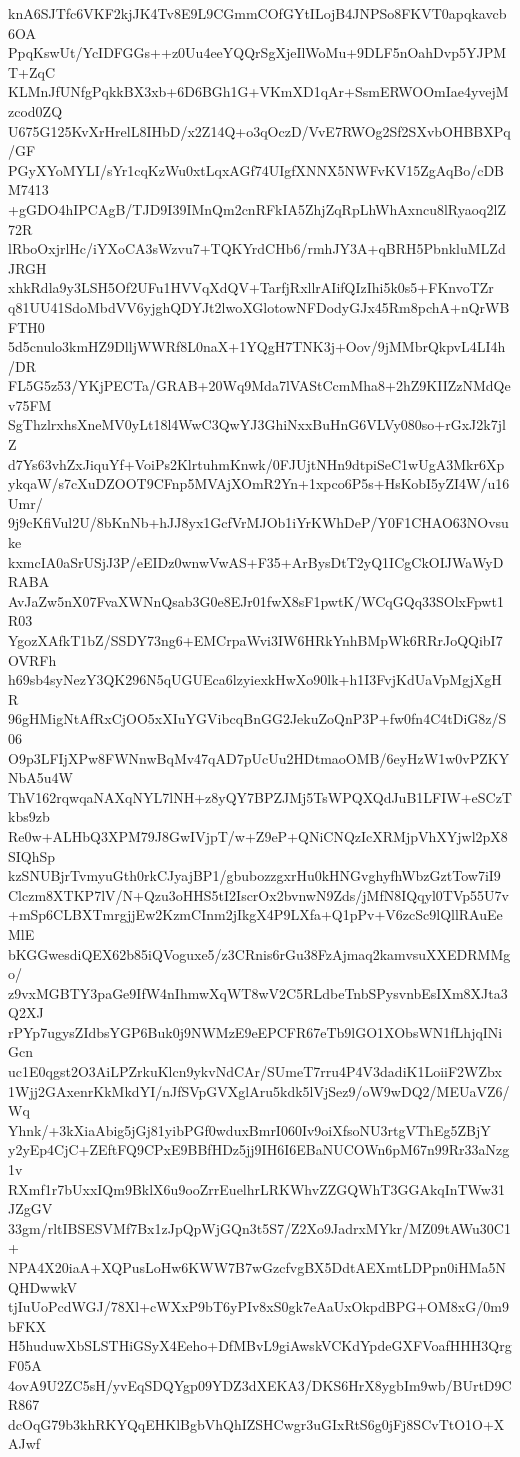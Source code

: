 knA6SJTfc6VKF2kjJK4Tv8E9L9CGmmCOfGYtILojB4JNPSo8FKVT0apqkavcb6OA
PpqKswUt/YcIDFGGs++z0Uu4eeYQQrSgXjeIlWoMu+9DLF5nOahDvp5YJPMT+ZqC
KLMnJfUNfgPqkkBX3xb+6D6BGh1G+VKmXD1qAr+SsmERWOOmIae4yvejMzcod0ZQ
U675G125KvXrHrelL8IHbD/x2Z14Q+o3qOczD/VvE7RWOg2Sf2SXvbOHBBXPq/GF
PGyXYoMYLI/sYr1cqKzWu0xtLqxAGf74UIgfXNNX5NWFvKV15ZgAqBo/cDBM7413
+gGDO4hIPCAgB/TJD9I39IMnQm2cnRFkIA5ZhjZqRpLhWhAxncu8lRyaoq2lZ72R
lRboOxjrlHc/iYXoCA3sWzvu7+TQKYrdCHb6/rmhJY3A+qBRH5PbnkluMLZdJRGH
xhkRdla9y3LSH5Of2UFu1HVVqXdQV+TarfjRxllrAIifQIzIhi5k0s5+FKnvoTZr
q81UU41SdoMbdVV6yjghQDYJt2lwoXGlotowNFDodyGJx45Rm8pchA+nQrWBFTH0
5d5cnulo3kmHZ9DlljWWRf8L0naX+1YQgH7TNK3j+Oov/9jMMbrQkpvL4LI4h/DR
FL5G5z53/YKjPECTa/GRAB+20Wq9Mda7lVAStCcmMha8+2hZ9KIIZzNMdQev75FM
SgThzlrxhsXneMV0yLt18l4WwC3QwYJ3GhiNxxBuHnG6VLVy080so+rGxJ2k7jlZ
d7Ys63vhZxJiquYf+VoiPs2KlrtuhmKnwk/0FJUjtNHn9dtpiSeC1wUgA3Mkr6Xp
ykqaW/s7cXuDZOOT9CFnp5MVAjXOmR2Yn+1xpco6P5s+HsKobI5yZI4W/u16Umr/
9j9cKfiVul2U/8bKnNb+hJJ8yx1GcfVrMJOb1iYrKWhDeP/Y0F1CHAO63NOvsuke
kxmcIA0aSrUSjJ3P/eEIDz0wnwVwAS+F35+ArBysDtT2yQ1ICgCkOIJWaWyDRABA
AvJaZw5nX07FvaXWNnQsab3G0e8EJr01fwX8sF1pwtK/WCqGQq33SOlxFpwt1R03
YgozXAfkT1bZ/SSDY73ng6+EMCrpaWvi3IW6HRkYnhBMpWk6RRrJoQQibI7OVRFh
h69sb4syNezY3QK296N5qUGUEca6lzyiexkHwXo90lk+h1I3FvjKdUaVpMgjXgHR
96gHMigNtAfRxCjOO5xXIuYGVibcqBnGG2JekuZoQnP3P+fw0fn4C4tDiG8z/S06
O9p3LFIjXPw8FWNnwBqMv47qAD7pUcUu2HDtmaoOMB/6eyHzW1w0vPZKYNbA5u4W
ThV162rqwqaNAXqNYL7lNH+z8yQY7BPZJMj5TsWPQXQdJuB1LFIW+eSCzTkbs9zb
Re0w+ALHbQ3XPM79J8GwIVjpT/w+Z9eP+QNiCNQzIcXRMjpVhXYjwl2pX8SIQhSp
kzSNUBjrTvmyuGth0rkCJyajBP1/gbubozzgxrHu0kHNGvghyfhWbzGztTow7iI9
Clczm8XTKP7lV/N+Qzu3oHHS5tI2IscrOx2bvnwN9Zds/jMfN8IQqyl0TVp55U7v
+mSp6CLBXTmrgjjEw2KzmCInm2jIkgX4P9LXfa+Q1pPv+V6zcSc9lQllRAuEeMlE
bKGGwesdiQEX62b85iQVoguxe5/z3CRnis6rGu38FzAjmaq2kamvsuXXEDRMMgo/
z9vxMGBTY3paGe9IfW4nIhmwXqWT8wV2C5RLdbeTnbSPysvnbEsIXm8XJta3Q2XJ
rPYp7ugysZIdbsYGP6Buk0j9NWMzE9eEPCFR67eTb9lGO1XObsWN1fLhjqINiGcn
uc1E0qgst2O3AiLPZrkuKlcn9ykvNdCAr/SUmeT7rru4P4V3dadiK1LoiiF2WZbx
1Wjj2GAxenrKkMkdYI/nJfSVpGVXglAru5kdk5lVjSez9/oW9wDQ2/MEUaVZ6/Wq
Yhnk/+3kXiaAbig5jGj81yibPGf0wduxBmrI060Iv9oiXfsoNU3rtgVThEg5ZBjY
y2yEp4CjC+ZEftFQ9CPxE9BBfHDz5jj9IH6I6EBaNUCOWn6pM67n99Rr33aNzg1v
RXmf1r7bUxxIQm9BklX6u9ooZrrEuelhrLRKWhvZZGQWhT3GGAkqInTWw31JZgGV
33gm/rltIBSESVMf7Bx1zJpQpWjGQn3t5S7/Z2Xo9JadrxMYkr/MZ09tAWu30C1+
NPA4X20iaA+XQPusLoHw6KWW7B7wGzcfvgBX5DdtAEXmtLDPpn0iHMa5NQHDwwkV
tjIuUoPcdWGJ/78Xl+cWXxP9bT6yPIv8xS0gk7eAaUxOkpdBPG+OM8xG/0m9bFKX
H5huduwXbSLSTHiGSyX4Eeho+DfMBvL9giAwskVCKdYpdeGXFVoafHHH3QrgF05A
4ovA9U2ZC5sH/yvEqSDQYgp09YDZ3dXEKA3/DKS6HrX8ygbIm9wb/BUrtD9CR867
dcOqG79b3khRKYQqEHKlBgbVhQhIZSHCwgr3uGIxRtS6g0jFj8SCvTtO1O+XAJwf

